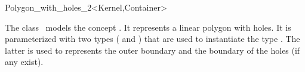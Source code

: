 \ccRefPageBegin

\begin{ccRefClass}{Polygon_with_holes_2<Kernel,Container>}

\ccThreeToTwo

\ccDefinition
The class \ccRefName\ models the concept .
It represents a linear polygon with holes. It is parameterized with two
types ( and ) that are used to instantiate
the type . The latter is used to
represents the outer boundary and the boundary of the holes (if any exist).

 
\ccIsModel

\end{ccRefClass}
\ccRefPageEnd
